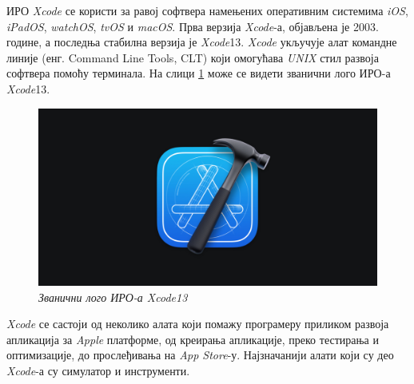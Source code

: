 \documentclass[12pt,oneside]{memoir}
\begin{document}
\indent ИРО \textit{Xcode} се користи за равој софтвера намењених оперативним системима \textit{iOS}, \textit{iPadOS}, \textit{watchOS}, \textit{tvOS} и \textit{macOS}. Прва верзија \textit{Xcode}-а, објављена је 2003. године, а последња стабилна верзија је \textit{Xcode}13. \textit{Xcode} укључује алат командне линије (енг. Command Line Tools, CLT) који омогућава \textit{UNIX} стил развоја софтвера помоћу терминала. На слици \ref{slika:xcode13_logo} може се видети званични лого ИРО-а \textit{Xcode}13.

\begin{figure}[H]
\includegraphics[width=1\textwidth]{images/Xcode_logo.jpg}
\centering
\caption{\textit{Званични лого ИРО-а Xcode13}}
\label{slika:xcode13_logo}
\end{figure}

\indent \textit{Xcode} се састоји од неколико алата који помажу програмеру приликом развоја апликација за \textit{Apple} платформе, од креирања апликације, преко тестирања и оптимизације, до прослеђивања на \textit{App Store}-у. Најзначанији алати који су део \textit{Xcode}-а су симулатор и инструменти.
\end{document}
